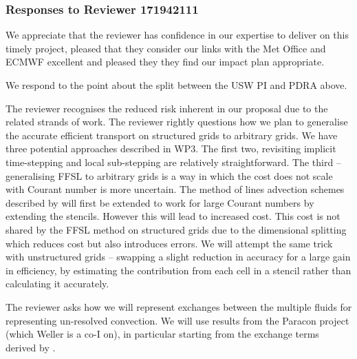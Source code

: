 \subsubsection*{Responses to Reviewer 171942111}

We appreciate that the reviewer has confidence in our expertise to deliver on this timely project, pleased that they consider our links with the Met Office and ECMWF excellent and pleased they they find our impact plan appropriate.

We respond to the point about the split between the USW PI and PDRA above.

The reviewer recognises the reduced risk inherent in our proposal due to the related strands of work. The reviewer rightly questions how we plan to generalise the accurate efficient transport on structured grids to arbitrary grids. We have three potential approaches described in WP3. The first two, revisiting implicit time-stepping and local sub-stepping are relatively straightforward. The third -- generalising FFSL to arbitrary grids is a way in which the cost does not scale with Courant number is more uncertain. The method of lines advection schemes described by \cite{SWMD17,MBS+18} will first be extended to work for large Courant numbers by extending the stencils. However this will lead to increased cost. This cost is not shared by the FFSL method on structured grids due to the dimensional splitting which reduces cost but also introduces errors. We will attempt the same trick with unstructured grids -- swapping a slight reduction in accuracy for a large gain in efficiency, by estimating the contribution from each cell in a stencil rather than calculating it accurately. 

The reviewer asks how we will represent exchanges between the multiple fluids for representing un-resolved convection. We will use results from the Paracon project (which Weller is a co-I on), in particular starting from the exchange terms derived by \cite{TEB19}.

\renewcommand{\refname}{References}




